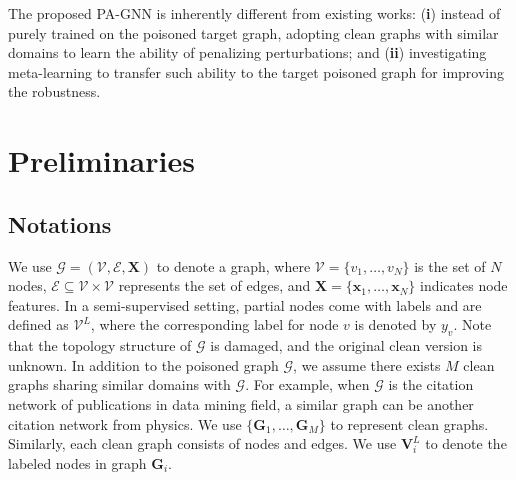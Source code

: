 \documentclass[sigconf]{acmart}
\newcommand{\ours}{{PA-GNN}\xspace}
\def \E {\mathcal{E}}
\def \G {\mathcal{G}}
\def \V {\mathcal{V}}
\def \bg {\mathbf{G}}
\def \X {\mathbf{X}}
\def \x {\mathbf{x}}
\begin{document}
The proposed \ours is inherently different from existing works: (\textbf{i}) instead of purely trained on the poisoned target graph, adopting clean graphs with similar domains to learn the ability of penalizing perturbations; and (\textbf{ii}) investigating meta-learning to transfer such ability to the target poisoned graph for improving the robustness.  \section{Preliminaries}
\subsection{Notations}
We use $\G = (\V, \E, \X)$ to denote a graph, where $\V = \{v_1, \dots, v_N\}$ is the set of $N$ nodes, $\E \subseteq \V \times \V$ represents the set of edges, and $\X = \{\x_1, \dots, \x_N\}$ indicates node features. In a semi-supervised setting, partial nodes come with labels and are defined as $\V^L$, where the corresponding label for node $v$ is denoted by $y_v$. Note that the topology structure of $\G$ is damaged, and the original clean version is unknown.
In addition to the poisoned graph $\G$, we assume there exists $M$ clean graphs sharing similar domains with $\G$. For example, when $\G$ is the citation network of publications in data mining field, a similar graph can be another citation network from physics. We use $\{\bg_1, \dots, \bg_M\}$ to represent clean graphs. Similarly, each clean graph consists of nodes and edges. We use $\mathbf{V}_i^L$ to denote the labeled nodes in graph $\bg_i$.
\end{document}
